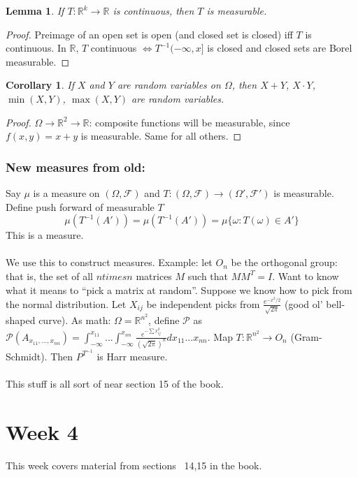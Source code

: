 \documentclass[12pt]{article}
\newtheorem{lemma}{Lemma}
\newtheorem{corr}{Corollary}
\begin{document}
\begin{lemma}
If $T: \mathbb{R}^k \rightarrow \mathbb{R}$ is continuous, then $T$ is measurable.
\end{lemma}
\begin{proof}
Preimage of an open set is open (and closed set is closed) iff $T$ is continuous.  In $\mathbb{R}$, $T$ continuous $\Leftrightarrow T^{-1}(-\infty, x]$ is closed and closed sets are Borel measurable.
\end{proof}

\begin{corr}
If $X$ and $Y$ are random variables on $\Omega$, then $X+Y$, $X \cdot Y$, $\min(X, Y)$, $\max(X,Y)$ are random variables.
\end{corr}
\begin{proof}
$\Omega \rightarrow \mathbb{R}^2 \rightarrow \mathbb{R}$: composite functions will be measurable, since $f(x,y) = x+y$ is measurable.  Same for all others.
\end{proof}

\subsubsection{New measures from old:}
Say $\mu$ is a measure on $(\Omega, \mathcal{F})$ and $T: (\Omega, \mathcal{F}) \rightarrow (\Omega', \mathcal{F}')$ is measurable.  Define push forward of measurable $T$
$$\mu(T^{-1} (A'))  = \mu(T^{-1}(A')) = \mu \{ \omega : T(\omega) \in A'\}$$
This is a measure.
\\ \\
We use this to construct measures.  Example: let $O_n$ be the orthogonal group: that is, the set of all $n times n$ matrices $M$ such that $MM^T = I$.  Want to know what it means to ``pick a matrix at random''.  Suppose we know how to pick from the normal distribution.  Let $X_{ij}$ be independent picks from $\frac{e^{-x^2/2}}{\sqrt{2 \pi}}$ (good ol' bell-shaped curve).  As math: $\Omega = \mathbb{R}^{n^2}$, define $\mathcal{P}$ as $\mathcal{P}(A_{x_{11}, ..., x_{nn}}) = \int_{-\infty}^{x_{11}} ... \int_{-\infty}^{x_{nn}} \frac{e^{-\sum x_{ij}^2}}{(\sqrt{2 \pi})^n} d x_{11} ... x_{nn}$.  Map $T: \mathbb{R}^{n^2} \rightarrow O_n$ (Gram-Schmidt).  Then $P^{T^{-1}}$ is Harr measure.
\\ \\
This stuff is all sort of near section 15 of the book.  

\section{Week 4}
This week covers material from sections ~14,15 in the book.
\end{document}
